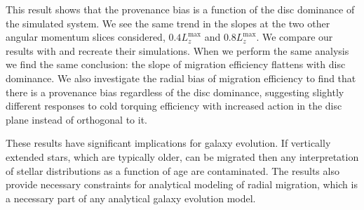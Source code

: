 This result shows that the provenance bias is a function of the disc dominance of the simulated system. We see the same trend in the slopes at the two other angular momentum slices considered, $0.4 L_z^\mathrm{max}$ and $0.8 L_z^\mathrm{max}$. We compare our results with \cite{vera-ciro:16b} and recreate their simulations. When we perform the same analysis we find the same conclusion: the slope of migration efficiency flattens with disc dominance. We also investigate the radial bias of migration efficiency to find that there is a provenance bias regardless of the disc dominance, suggesting slightly different responses to cold torquing efficiency with increased action in the disc plane instead of orthogonal to it.

These results have significant implications for galaxy evolution. If vertically extended stars, which are typically older, can be migrated then any interpretation of stellar distributions as a function of age are contaminated. The results also provide necessary constraints for analytical modeling of radial migration, which is a necessary part of any analytical galaxy evolution model.

